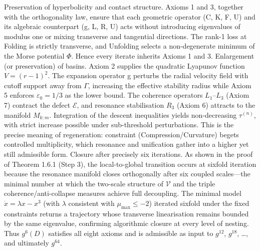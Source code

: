 Preservation of hyperbolicity and contact structure. Axioms 1 and 3, together with the orthogonality law, ensure that each geometric operator (C, K, F, U) and its algebraic counterpart (g, L, R, U) acts without introducing eigenvalues of modulus one or mixing transverse and tangential directions. The rank-1 loss at Folding is strictly transverse, and Unfolding selects a non-degenerate minimum of the Morse potential $  \Phi  $. Hence every iterate inherits Axioms 1 and 3.
Enlargement (or preservation) of basins. Axiom 2 supplies the quadratic Lyapunov function $  V = (r-1)^2  $. The expansion operator g perturbs the radial velocity field with cutoff support away from $  \Gamma  $, increasing the effective stability radius while Axiom 5 enforces $  \varepsilon_0 = 1/3  $ as the lower bound. The coherence operators $  L_1  $–$  L_3  $ (Axiom 7) contract the defect $  \mathcal{E}  $, and resonance stabilisation $  R_3  $ (Axiom 6) attracts to the manifold $  M_{k:m}  $. Integration of the descent inequalities yields non-decreasing $  \tau^{(n)}  $, with strict increase possible under sub-threshold perturbations. This is the precise meaning of regeneration: constraint (Compression/Curvature) begets controlled multiplicity, which resonance and unification gather into a higher yet still admissible form.
Closure after precisely six iterations. As shown in the proof of Theorem 1.6.1 (Step 3), the local-to-global transition occurs at sixfold iteration because the resonance manifold closes orthogonally after six coupled scales—the minimal number at which the two-scale structure of $  \mathcal{V}  $ and the triple coherence/anti-collapse measures achieve full decoupling. The minimal model $  \dot{x} = \lambda x - x^3  $ (with $  \lambda  $ consistent with $  \mu_{\max} \le -2  $) iterated sixfold under the fixed constraints returns a trajectory whose transverse linearisation remains bounded by the same eigenvalue, confirming algorithmic closure at every level of nesting. Thus $  g^6(D)  $ satisfies all eight axioms and is admissible as input to $  g^{12}  $, $  g^{18}  $, …, and ultimately $  g^{64}  $.

